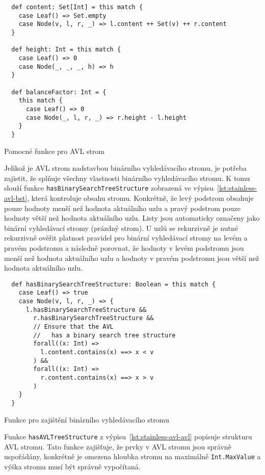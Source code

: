 \begin{listing}[H]
  \begin{verbatim}
  def content: Set[Int] = this match {
    case Leaf() => Set.empty
    case Node(v, l, r, _) => l.content ++ Set(v) ++ r.content
  }

  def height: Int = this match {
    case Leaf() => 0
    case Node(_, _, _, h) => h
  }

  def balanceFactor: Int = {
    this match {
      case Leaf() => 0
      case Node(_, l, r, _) => r.height - l.height
    }
  }
  \end{verbatim}
  \caption{Pomocné funkce pro AVL strom}
  \label{lst:stainless-avl-helper}
\end{listing}

Jelikož je AVL strom nadstavbou binárního vyhledávacího stromu,
je potřeba zajistit, že splňuje všechny vlastnosti binárního vyhledávacího stromu.
K tomu slouží funkce \texttt{hasBinarySearchTreeStructure} zobrazená ve výpisu~\ref{lst:stainless-avl-bst},
která kontroluje obsahu stromu.
Konkrétně, že levý podstrom obsahuje pouze hodnoty menší než hodnota aktuálního uzlu
a pravý podstrom pouze hodnoty větší než hodnota aktuálního uzlu.
Listy jsou automaticky označeny jako binární vyhledávací stromy (prázdný strom).
U uzlů se rekurzivně je nutné rekurzivně ověřit platnost pravidel pro
binární vyhledávací stromy na levém a pravém podstromu
a následně porovnat, že hodnoty v levém podstromu jsou menší než hodnota aktuálního uzlu
a hodnoty v pravém podstromu jsou větší než hodnota aktuálního uzlu.

\begin{listing}[H]
  \begin{verbatim}
  def hasBinarySearchTreeStructure: Boolean = this match {
    case Leaf() => true
    case Node(v, l, r, _) => {
      l.hasBinarySearchTreeStructure &&
        r.hasBinarySearchTreeStructure &&
        // Ensure that the AVL
        //   has a binary search tree structure
        forall((x: Int) =>
          l.content.contains(x) ==> x < v
        ) &&
        forall((x: Int) =>
          r.content.contains(x) ==> x > v
        )
    }
  }
  \end{verbatim}
  \caption{Funkce pro zajištění binárního vyhledávacího stromu}
  \label{lst:stainless-avl-bst}
\end{listing}

Funkce \texttt{hasAVLTreeStructure} z výpisu~\ref{lst:stainless-avl-avl}
popisuje strukturu AVL stromu.
Tato funkce zajišťuje, že prvky v AVL stromu jsou správně uspořádány,
konkrétně je omezena hloubka stromu na maximálně \texttt{Int.MaxValue}
a výška stromu musí být správně vypočítaná.

